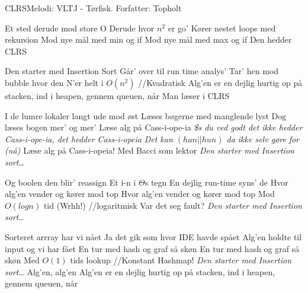 \begin{sang}{CLRS}{Melodi: VLTJ - Tørfisk. Forfatter: Topholt}
    \begin{vers}
    Et sted derude mod store O
    Derude hvor $n^2$ er go'
    Kører nestet loops med rekursion
    Mod nye mål med min og if
    Mod nye mål med max og if
    Den hedder CLRS
    \end{vers}
    
    \begin{omkvaed}
    Den starter med Insertion Sort
    Går' over til run time analys'
    Tar' hen mod bubble hvor den N'er helt i $O(n^2)$ //Kvadratisk
    Alg'en er en dejlig hurtig op på stacken, ind i heapen, gennem queuen, når
    Man læser i CLRS
    \end{omkvaed}
    
    \begin{vers}
    I de lumre lokaler langt ude mod øst
    Læses bøgerne med manglende lyst
    Dog læses bogen mer' og mer'
    Læse alg på Cass-i-ope-ia
    \textit{\$s du ved godt det ikke hedder Cass-i-ope-ia, det hedder Cass-i-opeia}
    \textit{Det kan $(han||hun)$ da ikke selv gøre for (nå)}
    Læse alg på Cass-i-opeia!
    Med Bacci som lektor
    \emph{Den starter med Insertion sort}\ldots
    \end{vers}
    
    \begin{vers}
    Og boolen den blir' reassign
    Et i-n i $\Theta$s tegn
    En dejlig run-time syns' de
    Hvor alg'en vender og kører mod top
    Hvor alg'en vender og kører mod top
    Mod $O(log n)$ tid (Wrhh!) //logaritmisk
    Var det seg fault?
    \emph{Den starter med Insertion sort}\ldots
    \end{vers}

    \begin{vers}
    Sorteret arrray har vi nået
    Ja det gik som hvor IDE havde spået
    Alg'en holdte til input og vi har fået
    En tur med hash og graf så skøn
    En tur med hash og graf så skøn
    Med $O(1)$ tids lookup //Konstant
    Hashmap!
    \emph{Den starter med Insertion sort}\ldots
    Alg'en, alg'en
    Alg'en er en dejlig hurtig op på stacken, ind i heapen, gennem queuen, når
    \end{vers}
\end{sang}